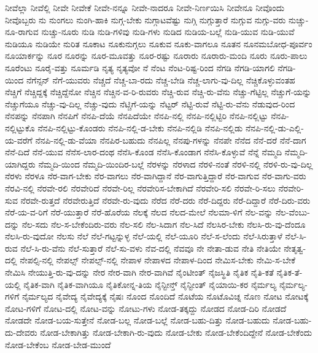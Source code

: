 {ನೀವೆಲ್ಲಾ
ನೀವೆಲ್ಲಿ
ನೀವೇ
ನೀವೇಕೆ
ನೀವೇ-ನನ್ನೂ
ನೀವೇ-ನಾದರೂ
ನೀವೇ-ನಿರ್ಣಯಿಸಿ
ನೀವೇನೂ
ನೀವೊಂದು
ನೀವೊಬ್ಬರು
ನು
ನುಂಗಲು
ನುಂಗಿ-ಹಾಕಿ
ನುಗ್ಗ-ಬೇಕು
ನುಗ್ಗಾಟವೆಷ್ಟು
ನುಗ್ಗಿ
ನುಗ್ಗುತ್ತಾರೆ
ನುಗ್ಗುವ
ನುಗ್ಗು-ವರು
ನುಚ್ಚು-ನೂ-ರಾಗುವ
ನುಚ್ಚು-ನೂರು
ನುಡಿ
ನುಡಿ-ಗಳಿವು
ನುಡಿ-ಗಳು
ನುಡಿದ
ನುಡಿಯ-ಬಲ್ಲೆ
ನುಡಿ-ಯುವ
ನುಡಿ-ಯುವೆ
ನುಡಿಯೂ
ನುಡಿಯೇ
ನುರಿತ
ನೂಕಾಟ
ನೂಕುನುಗ್ಗಲು
ನೂಕುವ
ನೂಕು-ವಾಗಲೂ
ನೂತನ
ನೂನಮಬೋಧ-ಪೂರ್ವಂ
ನೂಯಾರ್ಕನ್ನು
ನೂರ
ನೂರನ್ನು
ನೂರ-ಮೂವತ್ತು
ನೂರ-ರಷ್ಟು
ನೂರಾರು
ನೂರಾರು-ಮಂದಿ
ನೂರು
ನೂರು-ಪಾಲು
ನೂರೆಂಟು
ನೂರೈ-ವತ್ತು
ನೂರ್ಮಡಿ
ನೃತ್ಯ
ನೃತ್ಯವೋ
ನೆ
ನೆಂಟ
ನೆಂಟ-ರಿಷ್ಟ-ರಿಂದ
ನೆಗಡಿ
ನೆಗಡಿ-ಯಾಗಲಿ
ನೆಗಡಿ-ಯಿಂದ
ನೆಗೆನ್ಸನ್
ನೆಗೆ-ಯುವರು
ನೆಚ್ಚದೆ
ನೆಚ್ಚ-ಬಾ-ರದು
ನೆಚ್ಚ-ಬೇಡಿ
ನೆಚ್ಚ-ಲಾಗು-ವು-ದಿಲ್ಲ
ನೆಚ್ಚಿಕೊಳ್ಳುವಂತಹ
ನೆಚ್ಚಿಗೆ
ನೆಚ್ಚಿದ್ದಕ್ಕೆ
ನೆಚ್ಚಿದ್ದೆನೋ
ನೆಚ್ಚಿನ
ನೆಚ್ಚಿನ-ವ-ರಿ-ರುವರು
ನೆಚ್ಚಿ-ರುವ
ನೆಚ್ಚಿ-ರು-ವೆನು
ನೆಚ್ಚು-ಗೆಟ್ಟಿಲ್ಲ
ನೆಚ್ಚುಗೆ-ಯನ್ನು
ನೆಚ್ಚುಗೆಯೂ
ನೆಚ್ಚು-ವು-ದಿಲ್ಲ
ನೆಚ್ಚು-ವುದು
ನೆಟ್ಚಿಗೆ-ಯನ್ನು
ನೆಟ್ಟರ್
ನೆಟ್ಟಿ-ರುವೆ
ನೆಟ್ಟಿ-ರು-ವೆನು
ನೆಡುವುದ-ರಿಂದ
ನೆನಪನ್ನು
ನೆನಪಾಗಿ
ನೆನಪಿಗೆ
ನೆನಪಿ-ದೆಯೆ
ನೆನಪಿದೆಯೇ
ನೆನಪಿ-ನಲ್ಲಿ
ನೆನಪಿ-ನಲ್ಲಿಟ್ಟಿರಿ
ನೆನಪಿ-ನಲ್ಲಿಟ್ಟು
ನೆನಪಿ-ನಲ್ಲಿಟ್ಟುಕೊ
ನೆನಪಿ-ನಲ್ಲಿಟ್ಟು-ಕೊಂಡರು
ನೆನಪಿ-ನಲ್ಲಿ-ಡ-ಬೇಕು
ನೆನಪಿ-ನಲ್ಲಿಡಿ
ನೆನಪಿ-ನಲ್ಲಿಡು
ನೆನಪಿ-ನಲ್ಲಿ-ಡು-ಎಲ್ಲಿ-ಯ-ವರೆಗೆ
ನೆನಪಿ-ನಲ್ಲಿ-ಡು-ವೆಯಾ
ನೆನಪಿರ-ಬಹುದು
ನೆನಪಿಲ್ಲ
ನೆನಪು-ಗಳನ್ನು
ನೆನಪೇ
ನೆನೆದ
ನೆನೆ-ದರೆ
ನೆನೆ-ದಾಗ
ನೆನೆ-ದಿದೆ
ನೆನೆ-ಯುವ
ನೆನೆಸ-ಲಾರ-ದಂಥ
ನೆನೆಸಿ-ಕೊಂಡ
ನೆನೆಸಿ-ಕೊಂಡಾಗ
ನೆನೆಸಿ-ಕೊಳ್ಳುವೆ
ನೆನ್ನೆ
ನೆಮ್ಮದಿ
ನೆಮ್ಮದಿ-ಯಾಗಿದ್ದರು
ನೆಮ್ಮದಿ-ಯಿಂದ
ನೆಮ್ಮದಿ-ಯಿಂದಿರ-ಬಲ್ಲೆ
ನೆರಳನ್ನು
ನೆರಳಾದ
ನೆರಳಿ-ನಂತೆ
ನೆರಳಿ-ನಲ್ಲಿ
ನೆರಳಿ-ರು-ವು-ದಿಲ್ಲ
ನೆರಳು
ನೆರಳೂ
ನೆರ-ವಾಗ-ಬೇಕು
ನೆರ-ವಾಗಲು
ನೆರ-ವಾಗಿದ್ದಾನೆ
ನೆರ-ವಾಗುತ್ತಿದ್ದಾರೆ
ನೆರ-ವಾಗುವ
ನೆರ-ವಾಗು-ವರು
ನೆರವಿ-ನಲ್ಲಿ
ನೆರವೇ-ರಲಿ
ನೆರವೇರಿದೆ
ನೆರವೇ-ರಿಲ್ಲ
ನೆರವೇರಿಸ-ಬೇಕಾಗಿದೆ
ನೆರವೇರಿ-ಸಲಿ
ನೆರವೇ-ರಿ-ಸಲು
ನೆರವೇರಿ-ಸುವ
ನೆರವೇ-ರುತ್ತದೆ
ನೆರವೇರುತ್ತಿದೆ
ನೆರವೇ-ರು-ವುದು
ನೆರೆದ
ನೆರೆ-ದರು
ನೆರೆ-ದಿದ್ದರು
ನೆರೆ-ದಿದ್ದಾರೆ
ನೆರೆ-ದಿರು-ವರು
ನೆರೆ-ಯ-ವ-ರಿಗೆ
ನೆರೆ-ಯುತ್ತಾರೆ
ನೆರೆ-ಹೊರೆಯ
ನೆಲಕ್ಕೆ
ನೆಲದ
ನೆಲದ-ಮೇಲೆ
ನೆಲಮಾ-ಳಿಗೆ
ನೆಲ-ವನ್ನು
ನೆಲ-ವೆಂಬು-ದನ್ನು
ನೆಲ-ಸದು
ನೆಲ-ಸ-ಬೇಕೆಂದಿರು-ವರು
ನೆಲ-ಸಲಿ
ನೆಲ-ಸಿದಾಗ
ನೆಲ-ಸಿದೆ
ನೆಲಸಿರ-ಬೇಕು
ನೆಲಸಿ-ರು-ವು-ದೆಂದೂ
ನೆಲಸಿ-ರು-ವುದೋ
ನೆಲಸು
ನೆಲೆ
ನೆಲೆ-ಗಟ್ಟನ್ನುಳ್ಳ
ನೆಲೆ-ಯಲ್ಲಿ
ನೆಲೆ-ಯೂರಿ
ನೆಲೆ-ಸ-ಲೆಂದು
ನೆಲೆ-ಸಿರುತ್ತಾಳೆ
ನೆಲೆ-ಸಿ-ರುವ
ನೆಲೆ-ಸಿ-ರು-ವೆನು
ನೆಲೆ-ಸುತ್ತಾರೆ
ನೆಲೆ-ಸು-ವಳು
ನೆವ-ದಲ್ಲಿ
ನೆವವೂ
ನೇ
ನೇತಾ-ಡುವ
ನೇತಿ
ನೇತಿಯೇ
ನೇತೃತ್ವ-ದಲ್ಲಿ
ನೇಪಲ್ಸಿ-ನಲ್ಲಿ
ನೇಪಲ್ಸ್
ನೇಪಲ್ಸ್-ನಲ್ಲಿ
ನೇಪಾಳ
ನೇಪಾಳದ
ನೇಪಾಳ-ದಿಂದ
ನೇಮಿಸ-ಬೇಕು
ನೇಮಿ-ಸ-ಬೇಕೆ
ನೇಮಿಸಿ
ನೇಯುತ್ತಿ-ರು-ವು-ದನ್ನು
ನೇರ
ನೇರ-ವಾಗಿ
ನೇರ-ವಾಗಿವೆ
ನೈಂಟೀಂತ್
ನೈಜಸ್ಥಿತಿ
ನೈತಿಕ
ನೈತಿ-ಕತೆ
ನೈತಿಕ-ತೆ-ಯಲ್ಲಿ
ನೈತಿಕ-ವಾಗಿ
ನೈತಿಕ-ವಾಗಿಯೂ
ನೈತಿಕೋನ್ನ-ತಿಯ
ನೈನ್ಟೀನ್ತ್
ನೈನ್ಟೀಂತ್
ನೈಯಾಯಿ-ಕರ
ನೈರ್ಮಲ್ಯ
ನೈರ್ಮಲ್ಯ-ಗಳಿಗೆ
ನೈರ್ಮಲ್ಯದ
ನೈವೇದ್ಯ
ನೈವೇದ್ಯಕ್ಕೆ
ನೈಷಃ
ನೊಂದ
ನೊಂದಿದೆ
ನೊಟೆಯ
ನೊಟೊವಿಚ್ನ
ನೊಣ
ನೋಟ
ನೋಟಕ್ಕೆ
ನೋಟ-ಗಳಿಗೆ
ನೋಟ-ದಲ್ಲಿ
ನೋಟ-ವನ್ನು
ನೋಟು-ಗಳು
ನೋಡ-ತಕ್ಕದ್ದು
ನೋಡದ
ನೋಡ-ದಿರಿ
ನೋಡದೆ
ನೋಡದೇ
ನೋಡ-ಬಯ-ಸುತ್ತೇನೆ
ನೋಡ-ಬಲ್ಲ
ನೋಡ-ಬಲ್ಲೆ
ನೋಡ-ಬಹು-ದಿತ್ತು
ನೋಡ-ಬಹುದು
ನೋಡ-ಬಹು-ದು-ದೇವರು
ನೋಡ-ಬೇಕಾಗಿತ್ತು
ನೋಡ-ಬೇಕಾಗಿ-ರು-ವುದು
ನೋಡ-ಬೇಕು
ನೋಡ-ಬೇಕೆಂದಿದ್ದೇನೆ
ನೋಡ-ಬೇಕೆಂದು
ನೋಡ-ಬೇಕೆಂಬ
ನೋಡ-ಬೇಡ-ಮುಂದೆ
}

